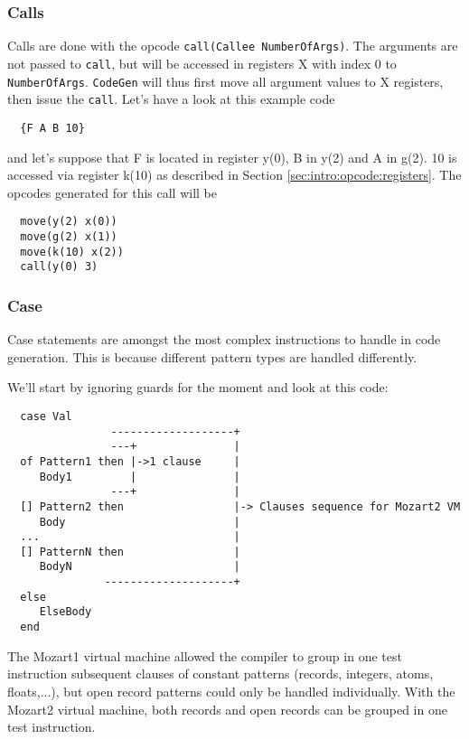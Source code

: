 \documentclass[a4paper]{memoir}
\begin{document}
\subsubsection{Calls}\label{sec:codegen:calls}
Calls are done with the opcode \lstinline!call(Callee NumberOfArgs)!. The arguments are not passed to \lstinline!call!, but will be accessed in registers X with index 0 to \lstinline!NumberOfArgs!. \lstinline!CodeGen! will thus first move all argument values to X registers, then issue the \lstinline!call!.
Let's have a look at this example code
\begin{lstlisting}
  {F A B 10}
\end{lstlisting}
and let's suppose that F is located in register y(0), B in y(2)  and A in g(2). 10 is accessed via register k(10) as described in Section \ref{sec:intro:opcode:registers}.
The opcodes generated for this call will be 
\begin{lstlisting}
  move(y(2) x(0))
  move(g(2) x(1))
  move(k(10) x(2))
  call(y(0) 3)
\end{lstlisting}

\subsubsection{Case}\label{sec:arch:codegen:case}
Case statements are amongst the most complex instructions to handle in code generation. This is because different pattern types are handled differently. 


We'll start by ignoring guards for the moment and look at this code:

\begin{verbatim}
  case Val
                -------------------+
                ---+               |
  of Pattern1 then |->1 clause     |
     Body1         |               |
                ---+               |
  [] Pattern2 then                 |-> Clauses sequence for Mozart2 VM
     Body                          |
  ...                              |
  [] PatternN then                 |
     BodyN                         |
               --------------------+
  else
     ElseBody
  end

\end{verbatim}

The Mozart1 virtual machine allowed the compiler to group in one test instruction subsequent clauses of
constant patterns (records, integers, atoms, floats,...), but open
record patterns could only be handled individually.
With the Mozart2 virtual machine, both records and open records can be grouped in one test instruction.
\end{document}
